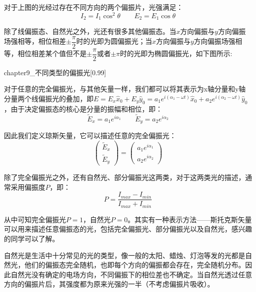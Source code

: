 \begin{law}
    对于上图的光经过存在不同方向的两个偏振片，光强满足：
    \[I_2 = I_1\cos^2\theta\qquad E_2 = E_1\cos\theta\]
\end{law}

除了线偏振态、自然光之外，光还有很多其他偏振态。当$x$方向偏振与$y$方向偏振场强相等，相位相差$\pm\dfrac{\pi}{2}$时的光即为圆偏振光；当$x$方向偏振与$y$方向偏振场强相等，相位相差某个值但不是$\pm\dfrac{\pi}{2}$或者$\pm\pi$时的光即为椭圆偏振光，如下图所示:
\begin{singlefigure}[不同类型的偏振光]{chapter9_不同类型的偏振光}[0.99]
\end{singlefigure}

对于任意的完全偏振光，与其他矢量一样，我们都可以将其表示为x轴分量和y轴分量两个线偏振光的叠加，即$E = E_x \hat{x}_0 + E_y \hat{y}_0 = a_1 e^{i(\alpha_1 - \omega t)}\hat{x}_0 + a_2 e^{i(\alpha_2 - \omega t)}\hat{y}_0$，由于决定偏振态的核心是分量的振幅和相位，即：
\[\tilde{E}_x = a_1 e^{i\alpha_1}\qquad \tilde{E}_y = a_2 e^{i\alpha_2}\]

因此我们定义琼斯矢量，它可以描述任意的完全偏振光：
\[\left(\begin{matrix}
    \tilde{E}_x\\
    \tilde{E}_y
\end{matrix}\right) = \left(\begin{matrix}
    a_1 e^{i\alpha_1}\\
    a_2 e^{i\alpha_2}
\end{matrix}
\right)\]

除了完全偏振光之外，还有自然光、部分偏振光这两类，对于这两类光的描述，通常采用偏振度$P$，即：
\[P = \dfrac{I_{max} - I_{min}}{I_{max} + I_{min}}\]

从中可知完全偏振光$P=1$，自然光$P=0$。其实有一种表示方法——斯托克斯矢量可以用来描述任意偏振态的光，包括完全偏振光、部分偏振光以及自然光，感兴趣的同学可以了解。

自然光是生活中十分常见的光的类型，像一般的太阳、蜡烛、灯泡等发的光都是自然光，他们的偏振态完全随机，也即每个方向的偏振都会存在，完全随机分布。因此自然光没有确定的电场方向，不同偏振下的相位差也不确定。当自然光透过任意方向的偏振片后，其强度都为原来光强的一半（不考虑偏振片吸收）。


